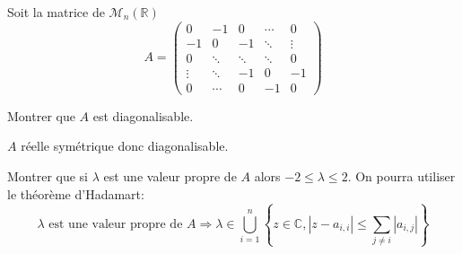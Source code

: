 \documentclass{article}[11pt]
\begin{document}
\begin{enumerate}
%

{\color{blue}
\item Soit la matrice de  $\mathcal{M}_n(\mathbb{R})$ 
\[A=
\left(\begin{array}{ccccc}
0&-1&0&\cdots&0\\
-1&0&-1&\ddots&\vdots\\
0&  \ddots &\ddots&\ddots&0\\
\vdots &\ddots &-1&0&-1\\
   0&\cdots &0&-1 &0
\end{array}\right)
\] 
}
\begin{enumerate}
{\color{blue}
\item Montrer que $A$ est diagonalisable.
}

$A$ réelle symétrique donc diagonalisable.
{\color{blue}
\item Montrer que si $\lambda$ est une valeur propre de $A$ alors $-2\leq \lambda\leq 2$. On pourra utiliser le théorème d'Hadamart:
\[\lambda \mbox{ est une valeur propre de } A \Longrightarrow \lambda\in \bigcup_{i=1}^n \left\{z\in \mathbb{C}, |z-a_{i,i}|\leq\sum_{j\neq i}|a_{i,j}|\right\}\]
}


\end{enumerate}
\end{enumerate}
\end{document}
